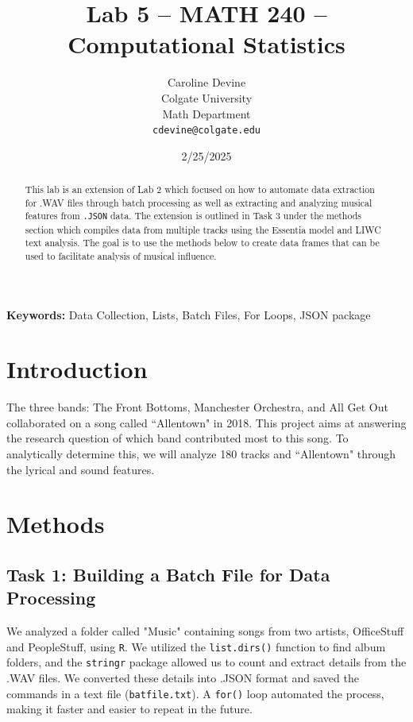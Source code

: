\documentclass{article}\usepackage[]{graphicx}\usepackage[]{xcolor}
\begin{document}
\vspace{-1in}
\title{Lab 5 -- MATH 240 -- Computational Statistics}

\author{
  Caroline Devine \\
  Colgate University  \\
  Math Department  \\
  {\tt cdevine@colgate.edu}
}

\date{2/25/2025}

\maketitle

\begin{multicols}{2}
\begin{abstract}
This lab is an extension of Lab 2 which focused on how to automate data extraction for .WAV files through batch processing as well as extracting and analyzing musical features from \texttt{.JSON} data. The extension is outlined in Task 3 under the methods section which compiles data from multiple tracks using the Essentia model and LIWC text analysis. The goal is to use the methods below to create data frames that can be used to facilitate analysis of musical influence.
\end{abstract}

\noindent \textbf{Keywords:} Data Collection, Lists, Batch Files, For Loops, JSON package

\section{Introduction}
The three bands: The Front Bottoms, Manchester Orchestra, and All Get Out collaborated on a song called ``Allentown"\citep{Ross} in 2018. This project aims at answering the research question of which band contributed most to this song. To analytically determine this, we will analyze 180 tracks and ``Allentown" through the lyrical and sound features. 

\section{Methods}

\subsection{Task 1: Building a Batch File for Data Processing}

We analyzed a folder called "Music" containing songs from two artists, OfficeStuff and PeopleStuff, using \texttt{R}. We utilized the \texttt{list.dirs()} function to find album folders, and the \texttt{stringr} package\citep{Wickham} allowed us to count and extract details from the .WAV files. We converted these details into .JSON format and saved the commands in a text file (\texttt{batfile.txt}). A \texttt{for()} loop automated the process, making it faster and easier to repeat in the future.


\end{multicols}
\end{document}
